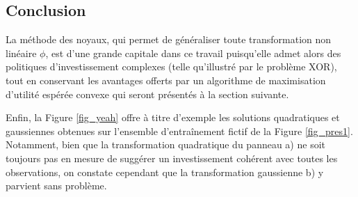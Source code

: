 \subsection{Conclusion}

La méthode des noyaux, qui permet de généraliser toute transformation non linéaire $\phi$,
est d'une grande capitale dans ce travail puisqu'elle admet alors des politiques
d'investissement complexes (telle qu'illustré par le problème XOR), tout en conservant les
avantages offerts par un algorithme de maximisation d'utilité espérée convexe qui seront
présentés à la section suivante.

Enfin, la Figure \ref{fig_yeah} offre à titre d'exemple les solutions quadratiques et
gaussiennes obtenues sur l'ensemble d'entraînement fictif de la Figure
\ref{fig_pres1}. Notamment, bien que la transformation quadratique du panneau a) ne soit
toujours pas en mesure de suggérer un investissement cohérent avec toutes les
observations, on constate cependant que la transformation gaussienne b) y parvient sans
problème.

